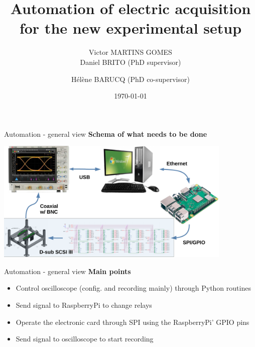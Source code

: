 \message{ !name(presentation.tex)}\documentclass[utf8]{beamer}
\title{Automation of electric acquisition for the new experimental setup}
\date{\today}
\author{Victor MARTINS GOMES \\[3mm] Daniel BRITO (PhD supervisor) \\ \and H\'{e}l\`{e}ne BARUCQ (PhD co-supervisor)}
\begin{document}

  \begin{frame}
	\titlepage
  \end{frame}
 
%
\begin{frame}{Automation - general view}
      \textbf{Schema of what needs to be done}
      \begin{center}
            \includegraphics[width=0.85\textwidth]{schema.pdf}
      \end{center}
\end{frame}
%
\begin{frame}{Automation - general view}
      \textbf{Main points}
      \begin{itemize}
            \item {Control oscilloscope (config. and recording mainly) through 
Python routines}
            \item {Send signal to RaspberryPi to change relays}
            \item {Operate the electronic card through SPI using the RaspberryPi' GPIO pins}
            \item {Send signal to oscilloscope to start recording}
      \end{itemize}
\end{frame}
\end{document}
